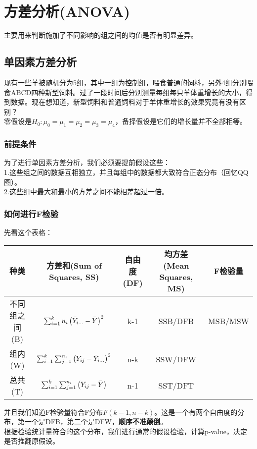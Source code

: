 \documentclass[UTF8]{ctexart}
\begin{document}
\section{方差分析(ANOVA)}
主要用来判断施加了不同影响的组之间的均值是否有明显差异。
\subsection{单因素方差分析}
现有一些羊被随机分为5组，其中一组为控制组，喂食普通的饲料，另外4组分别喂食ABCD四种新型饲料。过了一段时间后分别测量每组每只羊体重增长的大小，得到数据。现在想知道，新型饲料和普通饲料对于羊体重增长的效果究竟有没有区别？\\
\indent 零假设是$H_0: \mu_0=\mu_1=\mu_2=\mu_3=\mu_4$，备择假设是它们的增长量并不全部相等。
\subsubsection{前提条件}
为了进行单因素方差分析，我们必须要提前假设这些：\\
1.这些组之间的数据互相独立，并且每组中的数据都大致符合正态分布（回忆QQ图）。\\
2.这些组中最大和最小的方差之间不能相差超过一倍。\\
\subsubsection{如何进行F检验}
先看这个表格：
\begin{center}
    \begin{tabular}{|c|c|c|c|c|}
    \hline\hline
         种类&方差和(Sum of Squares, SS)&自由度(DF)&均方差(Mean Squares, MS)&F检验量 \\\hline
         不同组之间(B)&$\sum_{i=1}^kn_i\left(\Bar{Y}_{i\dots}-\Bar{Y}\right)^2$&k-1&SSB/DFB&MSB/MSW\\\hline
         组内(W)&$\sum_{i=1}^k\sum_{j=1}^{n_i}\left(Y_{ij}-\Bar{Y}_{i\dots}\right)^2$&n-k&SSW/DFW&~\\\hline
         总共(T)&$\sum_{i=1}^k\sum_{j=1}^{n_i}\left(Y_{ij}-\Bar{Y}\right)$&n-1&SST/DFT&~\\ \hline\hline
    \end{tabular}
\end{center}
并且我们知道F检验量符合F分布$F(k-1,n-k)$。这是一个有两个自由度的分布，第一个是DFB，第二个是DFW，\textbf{顺序不准颠倒}。\\
根据检验统计量符合的这个分布，我们进行通常的假设检验，计算p-value，决定是否推翻原假设。
\end{document}
